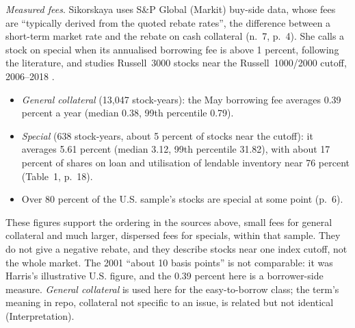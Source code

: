 \begin{qfdefinition}
\emph{Measured fees}. Sikorskaya uses S\&P Global (Markit) buy-side data, whose fees are ``typically derived from the quoted rebate rates'', the difference between a short-term market rate and the rebate on cash collateral (n.~7, p.~4). She calls a stock on special when its annualised borrowing fee is above 1 percent, following the literature, and studies Russell~3000 stocks near the Russell~1000/2000 cutoff, 2006--2018 \citep[author version of 27 April 2026, secs.~4.1--4.2, pp.~16--17]{catalogue-0897}.
\begin{itemize}
\item \emph{General collateral} (13{,}047 stock-years): the May borrowing fee averages 0.39 percent a year (median 0.38, 99th percentile 0.79).
\item \emph{Special} (638 stock-years, about 5 percent of stocks near the cutoff): it averages 5.61 percent (median 3.12, 99th percentile 31.82), with about 17 percent of shares on loan and utilisation of lendable inventory near 76 percent (Table~1, p.~18).
\item Over 80 percent of the U.S. sample's stocks are special at some point (p.~6).
\end{itemize}
These figures support the ordering in the sources above, small fees for general collateral and much larger, dispersed fees for specials, within that sample. They do not give a negative rebate, and they describe stocks near one index cutoff, not the whole market. The 2001 ``about 10 basis points'' is not comparable: it was Harris's illustrative U.S. figure, and the 0.39 percent here is a borrower-side measure. \emph{General collateral} is used here for the easy-to-borrow class; the term's meaning in repo, collateral not specific to an issue, is related but not identical (Interpretation).


\end{qfdefinition}
